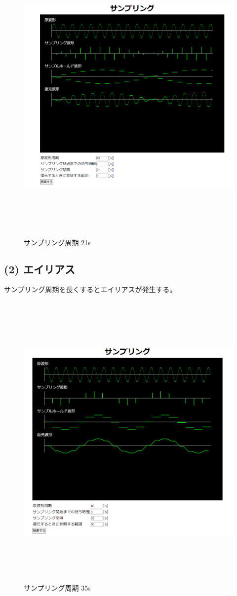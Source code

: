 \documentclass[a4paper,11pt]{jsarticle}
\begin{document}
\begin{figure}[H]
  \centering
  \includegraphics[height=15cm]{./images/sampring_21.png}
  \caption{サンプリング周期 21s}
  \label{fig:sample2}
\end{figure}
\newpage
\subsection{(2) エイリアス}
サンプリング周期を長くするとエイリアスが発生する。

\begin{figure}[H]
  \centering
  \includegraphics[height=15cm]{./images/エイリアス.png}
  \caption{サンプリング周期 35s}
  \label{fig:sample3}
\end{figure}
\end{document}
